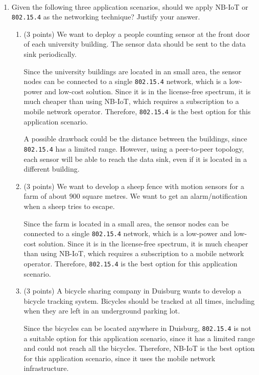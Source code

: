 \documentclass[12pt]{article}
\begin{document}
    \begin{ejercicio}[15 points]
        ~
        \begin{enumerate}[label=\alph*)]
            \item Given the following three application scenarios, should we apply NB-IoT or \verb|802.15.4| as the networking technique? Justify your answer.
            \begin{enumerate}[label=\roman*)]
                \item (3 points) We want to deploy a people counting sensor at the front door of each university building. The sensor data should be sent to the data sink periodically.
                
                Since the university buildings are located in an small area, the sensor nodes can be connected to a single \verb|802.15.4| network, which is a low-power and low-cost solution. Since it is in the license-free spectrum, it is much cheaper than using NB-IoT, which requires a subscription to a mobile network operator. Therefore, \verb|802.15.4| is the best option for this application scenario.

                A possible drawback could be the distance between the buildings, since \verb|802.15.4| has a limited range. However, using a peer-to-peer topology, each sensor will be able to reach the data sink, even if it is located in a different building.
                \item (3 points) We want to develop a sheep fence with motion sensors for a farm of about $900$ square metres. We want to get an alarm/notification when a sheep tries to escape.
                
                Since the farm is located in a small area, the sensor nodes can be connected to a single \verb|802.15.4| network, which is a low-power and low-cost solution. Since it is in the license-free spectrum, it is much cheaper than using NB-IoT, which requires a subscription to a mobile network operator. Therefore, \verb|802.15.4| is the best option for this application scenario.
                \item (3 points) A bicycle sharing company in Duisburg wants to develop a bicycle tracking system. Bicycles should be tracked at all times, including when they are left in an underground parking lot.
                
                Since the bicycles can be located anywhere in Duisburg, \verb|802.15.4| is not a suitable option for this application scenario, since it has a limited range and could not reach all the bicycles. Therefore, NB-IoT is the best option for this application scenario, since it uses the mobile network infrastructure.


\end{enumerate}
\end{enumerate}
\end{ejercicio}
\end{document}
